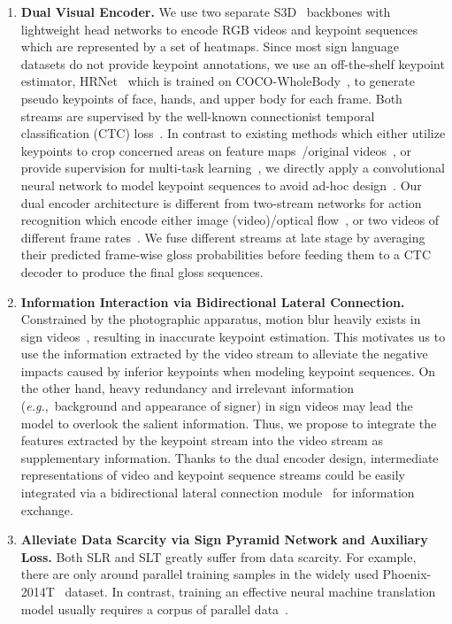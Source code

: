\documentclass{article}
\def\eg{\emph{e.g.}} \def\Eg{\emph{E.g.}}
\begin{document}
\begin{enumerate}[leftmargin=0.5cm]
    \item \textbf{Dual Visual Encoder.} We use two separate S3D~\cite{xie2018rethinking} backbones with lightweight head networks to encode RGB videos and keypoint sequences which are represented by a set of heatmaps. Since most sign language datasets do not provide keypoint annotations, we use an off-the-shelf keypoint estimator, HRNet~\cite{wang2020deep} which is trained on COCO-WholeBody~\cite{jin2020whole}, to generate pseudo keypoints of face, hands, and upper body for each frame. Both streams are supervised by the well-known connectionist temporal classification (CTC) loss~\cite{graves2006connectionist}. In contrast to existing methods which either utilize keypoints to crop concerned areas on feature maps~\cite{STMC_MM}/original videos~\cite{papadimitriou20_interspeech}, or provide supervision for multi-task learning~\cite{STMC_MM,Albanie2020bsl1k}, we directly apply a convolutional neural network to model keypoint sequences to avoid ad-hoc design~\cite{NSLT_keypoint, mseqgraph}. Our dual encoder architecture is different from two-stream networks for action recognition which encode either image (video)/optical flow~\cite{simonyan2014two,carreira2017quo}, or two videos of different frame rates~\cite{feichtenhofer2019slowfast}. We fuse different streams at late stage by averaging their predicted frame-wise gloss probabilities before feeding them to a CTC decoder to produce the final gloss sequences.  
\item \textbf{Information Interaction via Bidirectional Lateral Connection.} Constrained by the photographic apparatus, motion blur heavily exists in sign videos~\cite{P2014, camgoz2018neural}, resulting in inaccurate keypoint estimation. This motivates us to use the information extracted by the video stream to alleviate the negative impacts caused by inferior keypoints when modeling keypoint sequences. On the other hand, heavy redundancy and irrelevant information (\eg,~background and appearance of signer) in sign videos may lead the model to overlook the salient information. Thus, we propose to integrate the features extracted by the keypoint stream into the video stream as supplementary information. Thanks to the dual encoder design, intermediate representations of video and keypoint sequence streams could be easily integrated via a bidirectional lateral connection module~\cite{duan2021revisiting} for information exchange. \item\textbf{Alleviate Data Scarcity via Sign Pyramid Network and Auxiliary Loss.} Both SLR and SLT greatly suffer from data scarcity. For example, there are only around  parallel training samples in the widely used Phoenix-2014T~\cite{camgoz2018neural} dataset. In contrast, training an effective neural machine translation model usually requires a corpus of  parallel data~\cite{sennrich2019revisiting}. 

\end{enumerate}
\end{document}
